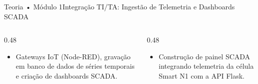 \begin{senaiframe}{Teoria • Módulo 1}{Integração TI/TA: Ingestão de Telemetria e Dashboards SCADA}
  \begin{columns}[t]
    \begin{column}{0.48\textwidth}
      \begin{tcolorbox}[senaibluecard, title={Fundamentos Teóricos}]
        \begin{itemize}
          \item Gateways IoT (Node-RED), gravação em banco de dados de séries temporais e criação de dashboards SCADA.
        \end{itemize}
      \end{tcolorbox}
    \end{column}
    \begin{column}{0.48\textwidth}
      \begin{tcolorbox}[senaigreencard, title={Prática \& Laboratório}]
        \begin{itemize}
          \item Construção de painel SCADA integrando telemetria da célula Smart N1 com a API Flask.
        \end{itemize}
      \end{tcolorbox}
    \end{column}
  \end{columns}
\end{senaiframe}
